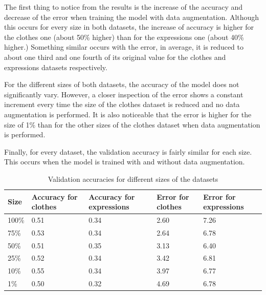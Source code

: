 \documentclass{article}
\begin{document}
The first thing to notice from the results is the increase of the accuracy and decrease of the error when training the model with data augmentation. Although this occurs for every size in both datasets, the increase of accuracy is higher for the clothes one (about 50\% higher) than for the expressions one (about 40\% higher.) Something similar occurs with the error, in average, it is reduced to about one third and one fourth of its original value for the clothes and expressions datasets respectively.

For the different sizes of both datasets, the accuracy of the model does not significantly vary. However, a closer inspection of the error shows a constant increment every time the size of the clothes dataset is reduced and no data augmentation is performed. It is also noticeable that the error is higher for the size of 1\% than for the other sizes of the clothes dataset when data augmentation is performed.

Finally, for every dataset, the validation accuracy is fairly similar for each size. This occurs when the model is trained with and without data augmentation.

\begin{table}[!htb]
  \centering
  \begin{tabular}{| l | l | l | l | l |}
    \hline
    \textbf{Size} & \textbf{Accuracy for clothes} & \textbf{Accuracy for expressions}& \textbf{Error for clothes} & \textbf{Error for expressions}\\ \hline
    100\% & 0.51 & 0.34 & 2.60 & 7.26 \\ \hline
    75\% & 0.53  & 0.34 & 2.64 & 6.78\\ \hline
    50\% & 0.51 & 0.35 &  3.13 & 6.40\\ \hline
    25\% & 0.52 & 0.34 & 3.42 & 6.81\\ \hline
    10\% & 0.55 & 0.34 & 3.97 & 6.77\\ \hline
    1\% & 0.50 & 0.32 & 4.69 & 6.78\\ \hline

  \end{tabular}
  \caption{Validation accuracies for different sizes of the datasets}
  \label{tab:2}
\end{table}
\end{document}
